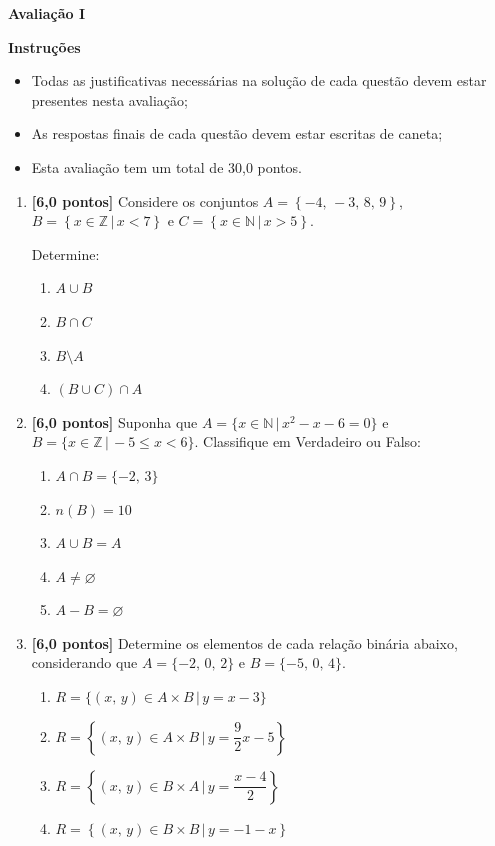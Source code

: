 \documentclass[12pt,a4paper]{article}
\begin{document}
\begin{center}
 \textbf{Avaliação I}
\end{center}

\textbf{Instruções}
\begin{itemize}
 \item Todas as justificativas necessárias na solução de cada questão devem estar presentes nesta avaliação;
 \item As respostas finais de cada questão devem estar escritas de caneta;
 \item Esta avaliação tem um total de 30,0 pontos.
\end{itemize}

\begin{enumerate}
  \item \textbf{[6,0 pontos]} Considere os conjuntos $A = \left\{-4,\,-3,\,8,\,9\right\}$,
    $B = \left\{x\in\mathbb{Z} \,|\, x < 7\right\}$ e
    $C = \left\{x\in\mathbb{N} \,|\, x > 5\right\}$.

    Determine:
    \begin{enumerate}
      \item $A\cup B$
      \item $B\cap C$
      \item $B\setminus A$
      \item $(B\cup C)\cap A$
    \end{enumerate}
  
  \item \textbf{[6,0 pontos]} Suponha que $A = \{x\in\mathbb{N} \,|\, x^2 - x - 6 = 0\}$ e 
    $B = \{x\in\mathbb{Z} \,|\, -5 \leq x < 6 \}$. Classifique em Verdadeiro ou
    Falso:

    \begin{enumerate}[(\ \ )]
      \item $A\cap B = \{-2,\,3\}$
      \item $n(B) = 10$
      \item $A\cup B = A$
      \item $A \neq \varnothing$
      \item $A - B = \varnothing$
    \end{enumerate}
  
  \item \textbf{[6,0 pontos]} Determine os elementos de cada relação binária abaixo,
    considerando que $A = \{-2,\,0,\,2\}$ e $B = \{-5,\, 0,\, 4\}$.
    \begin{enumerate}
      \item $R = \{(x,\,y) \in A\times B \,|\, y = x - 3\}$
      \item $R = \left\{(x,\,y) \in A\times B \,|\, y = \dfrac{9}{2}x - 5\right\}$
      \item $R = \left\{(x,\,y) \in B\times A \,|\, y = \dfrac{x - 4}{2}\right\}$
      \item $R = \left\{(x,\,y) \in B\times B \,|\, y = - 1 - x\right\}$
    \end{enumerate}


\end{enumerate}
\end{document}
